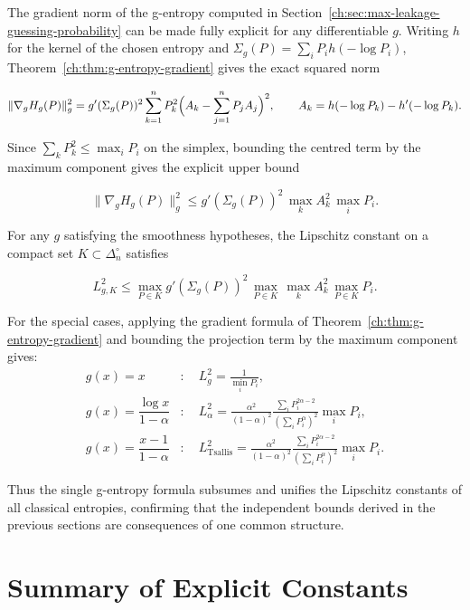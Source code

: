 The gradient norm of the g-entropy computed in
Section~\ref{ch:sec:max-leakage-guessing-probability} can be made fully explicit for any differentiable
\(g\).  Writing \(h\) for the kernel of the chosen entropy and
\(\Sigma_g(P)=\sum_i P_i h(-\log P_i)\),
Theorem~\ref{ch:thm:g-entropy-gradient} gives the exact squared norm

\[
\|\nabla_g H_g(P)\|_g^2
=
g'(\Sigma_g(P))^2
\sum_{k=1}^n
P_k^2
\Bigl(
A_k
-
\sum_{j=1}^n P_j A_j
\Bigr)^2,
\qquad
A_k=h(-\log P_k)-h'(-\log P_k).
\]

Since \(\sum_k P_k^2\le\max_i P_i\) on the simplex, bounding the
centred term by the maximum component gives the explicit upper bound

\[
\|\nabla_g H_g(P)\|_g^2
\le
g'(\Sigma_g(P))^2
\,
\max_k A_k^2
\,
\max_i P_i.
\]

\begin{corollary}
\label{ch:cor:g-entropy-lipschitz}
For any \(g\) satisfying the smoothness hypotheses, the Lipschitz
constant on a compact set \(K\subset\Delta_n^\circ\) satisfies

\[
L_{g,K}^2
\le
\max_{P\in K}
g'(\Sigma_g(P))^2
\,
\max_{P\in K}\,\max_k A_k^2
\,
\max_{P\in K} P_i.
\]

For the special cases, applying the gradient formula of
Theorem~\ref{ch:thm:g-entropy-gradient} and bounding the projection term
by the maximum component gives:
\begin{align*}
g(x)=x &: \quad L_g^2 = \frac{1}{\min_i P_i},\\[4pt]
g(x)=\dfrac{\log x}{1-\alpha} &: \quad
L_\alpha^2 = \frac{\alpha^2}{(1-\alpha)^2}
\frac{\sum_i P_i^{2\alpha-2}}{(\sum_i P_i^\alpha)^2}
\max_i P_i,\\[4pt]
g(x)=\dfrac{x-1}{1-\alpha} &: \quad
L_{\mathrm{Tsallis}}^2 = \frac{\alpha^2}{(1-\alpha)^2}
\frac{\sum_i P_i^{2\alpha-2}}{(\sum_i P_i^\alpha)^2}
\max_i P_i.
\end{align*}
\end{corollary}

Thus the single g-entropy formula subsumes and unifies the Lipschitz
constants of all classical entropies, confirming that the independent
bounds derived in the previous sections are consequences of one common
structure.

\section{Summary of Explicit Constants}\label{ch:sec:summary-of-explicit-constants}

